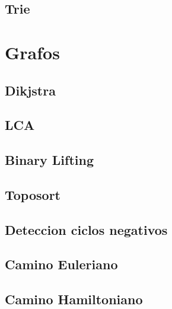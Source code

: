 \documentclass[a4paper,11pt,landscape,twocolumn]{article}
\begin{document}


\subsection{Trie}



\section{Grafos}

\subsection{Dikjstra}



\subsection{LCA}



\subsection{Binary Lifting}



\subsection{Toposort}



\subsection{Deteccion ciclos negativos}



\subsection{Camino Euleriano}



\subsection{Camino Hamiltoniano}
\end{document}
